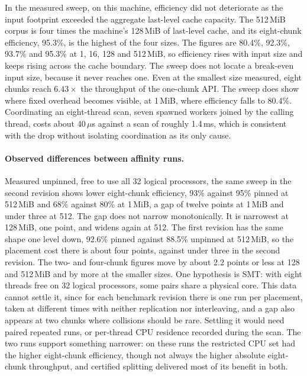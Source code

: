 \documentclass[11pt,a4paper]{article}
\theoremstyle{definition}
\theoremstyle{plain}
\begin{document}
In the measured sweep, on this machine, efficiency did not deteriorate as the input footprint exceeded the aggregate
last-level cache capacity. The 512\,MiB corpus is four times the machine's 128\,MiB of last-level cache, and its
eight-chunk efficiency, 95.3\%, is the highest of the four sizes. The figures are 80.4\%, 92.3\%, 93.7\% and 95.3\% at
1, 16, 128 and 512\,MiB, so efficiency rises with input size and keeps rising across the cache boundary. The sweep does
not locate a break-even input size, because it never reaches one. Even at the smallest size measured, eight chunks reach
$6.43\times$ the throughput of the one-chunk API. The sweep does show where fixed overhead becomes visible, at 1\,MiB,
where efficiency falls to 80.4\%. Coordinating an eight-thread scan, seven spawned workers joined by the calling thread,
costs about 40\,$\mu$s against a scan of roughly 1.4\,ms, which is consistent with the drop without isolating
coordination as its only cause.

\paragraph{Observed differences between affinity runs.} Measured unpinned, free to use all 32 logical processors, the
same sweep in the second revision shows lower eight-chunk efficiency, 93\% against 95\% pinned at 512\,MiB and 68\%
against 80\% at 1\,MiB, a gap of twelve points at 1\,MiB and under three at 512. The gap does not narrow monotonically.
It is narrowest at 128\,MiB, one point, and widens again at 512. The first revision has the same shape one level down,
92.6\% pinned against 88.5\% unpinned at 512\,MiB, so the placement cost there is about four points, against under three
in the second revision. The two- and four-chunk figures move by about 2.2 points or less at 128 and 512\,MiB and by more
at the smaller sizes. One hypothesis is SMT: with eight threads free on 32 logical processors, some pairs share a
physical core. This data cannot settle it, since for each benchmark revision there is one run per placement, taken at
different times with neither replication nor interleaving, and a gap also appears at two chunks where collisions should
be rare. Settling it would need paired repeated runs, or per-thread CPU residence recorded during the scan. The two runs
support something narrower: on these runs the restricted CPU set had the higher eight-chunk efficiency, though not
always the higher absolute eight-chunk throughput, and certified splitting delivered most of its benefit in both.
\end{document}
